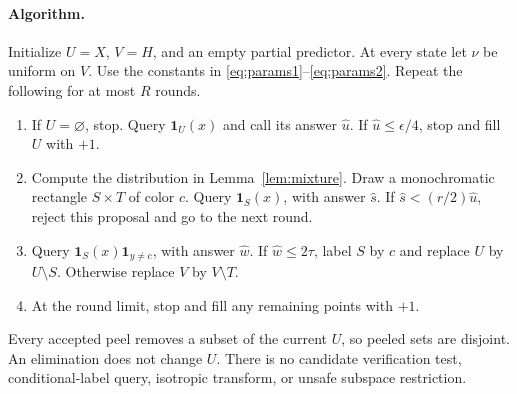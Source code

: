 \documentclass[11pt]{article}
\newcommand{\1}{\mathbf 1}
\begin{document}
\paragraph{Algorithm.}
Initialize $U=X$, $V=H$, and an empty partial predictor. At every state let $\nu$ be uniform on $V$. Use the constants in \eqref{eq:params1}--\eqref{eq:params2}. Repeat the following for at most $R$ rounds.
\begin{enumerate}
\item If $U=\varnothing$, stop. Query $\1_U(x)$ and call its answer $\widehat u$. If $\widehat u\le\epsilon/4$, stop and fill $U$ with $+1$.
\item Compute the distribution in Lemma~\ref{lem:mixture}. Draw a monochromatic rectangle $S\times T$ of color $c$. Query $\1_S(x)$, with answer $\widehat s$. If $\widehat s<(r/2)\widehat u$, reject this proposal and go to the next round.
\item Query $\1_S(x)\1_{y\ne c}$, with answer $\widehat w$. If $\widehat w\le2\tau$, label $S$ by $c$ and replace $U$ by $U\setminus S$. Otherwise replace $V$ by $V\setminus T$.
\item At the round limit, stop and fill any remaining points with $+1$.
\end{enumerate}
Every accepted peel removes a subset of the current $U$, so peeled sets are disjoint. An elimination does not change $U$. There is no candidate verification test, conditional-label query, isotropic transform, or unsafe subspace restriction.
\end{document}
